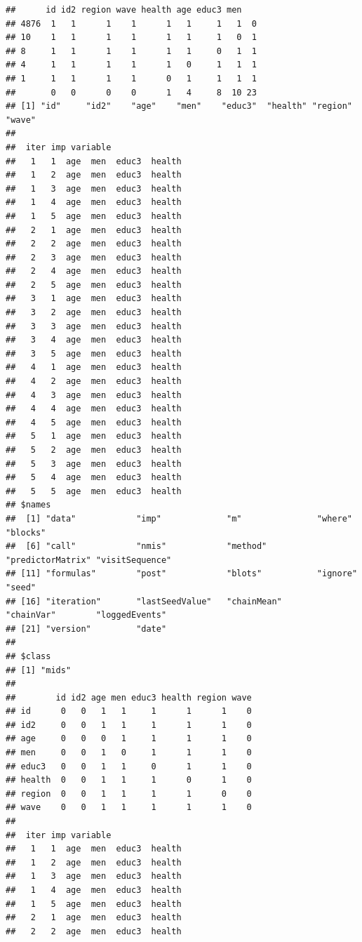 \documentclass[
]{book}
\begin{document}
\begin{verbatim}
##      id id2 region wave health age educ3 men   
## 4876  1   1      1    1      1   1     1   1  0
## 10    1   1      1    1      1   1     1   0  1
## 8     1   1      1    1      1   1     0   1  1
## 4     1   1      1    1      1   0     1   1  1
## 1     1   1      1    1      0   1     1   1  1
##       0   0      0    0      1   4     8  10 23
## [1] "id"     "id2"    "age"    "men"    "educ3"  "health" "region" "wave"  
## 
##  iter imp variable
##   1   1  age  men  educ3  health
##   1   2  age  men  educ3  health
##   1   3  age  men  educ3  health
##   1   4  age  men  educ3  health
##   1   5  age  men  educ3  health
##   2   1  age  men  educ3  health
##   2   2  age  men  educ3  health
##   2   3  age  men  educ3  health
##   2   4  age  men  educ3  health
##   2   5  age  men  educ3  health
##   3   1  age  men  educ3  health
##   3   2  age  men  educ3  health
##   3   3  age  men  educ3  health
##   3   4  age  men  educ3  health
##   3   5  age  men  educ3  health
##   4   1  age  men  educ3  health
##   4   2  age  men  educ3  health
##   4   3  age  men  educ3  health
##   4   4  age  men  educ3  health
##   4   5  age  men  educ3  health
##   5   1  age  men  educ3  health
##   5   2  age  men  educ3  health
##   5   3  age  men  educ3  health
##   5   4  age  men  educ3  health
##   5   5  age  men  educ3  health
## $names
##  [1] "data"            "imp"             "m"               "where"           "blocks"         
##  [6] "call"            "nmis"            "method"          "predictorMatrix" "visitSequence"  
## [11] "formulas"        "post"            "blots"           "ignore"          "seed"           
## [16] "iteration"       "lastSeedValue"   "chainMean"       "chainVar"        "loggedEvents"   
## [21] "version"         "date"           
## 
## $class
## [1] "mids"
## 
##        id id2 age men educ3 health region wave
## id      0   0   1   1     1      1      1    0
## id2     0   0   1   1     1      1      1    0
## age     0   0   0   1     1      1      1    0
## men     0   0   1   0     1      1      1    0
## educ3   0   0   1   1     0      1      1    0
## health  0   0   1   1     1      0      1    0
## region  0   0   1   1     1      1      0    0
## wave    0   0   1   1     1      1      1    0
## 
##  iter imp variable
##   1   1  age  men  educ3  health
##   1   2  age  men  educ3  health
##   1   3  age  men  educ3  health
##   1   4  age  men  educ3  health
##   1   5  age  men  educ3  health
##   2   1  age  men  educ3  health
##   2   2  age  men  educ3  health

\end{verbatim}
\end{document}
